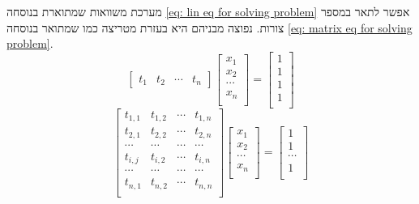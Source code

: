 \documentclass[12pt,leqno]{article}
\theoremstyle{theoremdd}
\begin{document}
מערכת משוואות 
שמתוארת בנוסחה
\ref{eq: lin eq for solving problem}
אפשר לתאר במספר צורות.
נפוצה מבניהם היא
בעזרת מטריצה כמו שמתואר 
בנוסחה 
\ref{eq: matrix eq for solving problem}.
\begin{equation*}
    \begin{bmatrix}
        t_1 & t_2 & \cdots & t_n
    \end{bmatrix}
    \begin{bmatrix}
        x_1 \\
        x_2 \\
        \cdots \\
        x_n \\
    \end{bmatrix}
    =
    \begin{bmatrix}
        1 \\
        1 \\
        1 \\
        1 \\
    \end{bmatrix}
\end{equation*}
\begin{equation}
    \label{eq: matrix eq for solving problem}
    \begin{bmatrix}
        t_{1,1} & t_{1,2} & \cdots & t_{1,n} \\
        t_{2,1} & t_{2,2} & \cdots & t_{2,n} \\
        \cdots & \cdots & \cdots & \cdots\\
        t_{i,j} & t_{i,2} & \cdots & t_{i,n} \\
        \cdots & \cdots & \cdots & \cdots\\
        t_{n,1} & t_{n,2} & \cdots & t_{n,n} \\
    \end{bmatrix}
    \begin{bmatrix}
        x_1 \\
        x_2 \\
        \cdots \\
        x_n \\
    \end{bmatrix}
    = 
    \begin{bmatrix}
        1 \\
        1 \\
        \cdots \\
        1 \\
    \end{bmatrix}
\end{equation}
\end{document}
